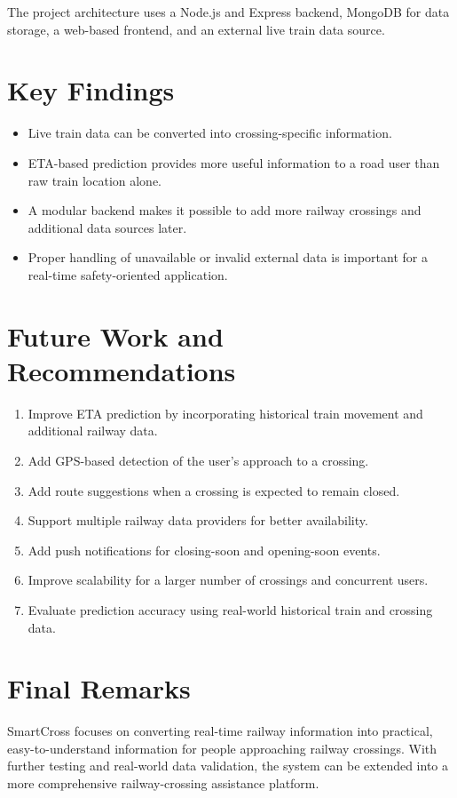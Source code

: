 \documentclass[12pt,a4paper]{report}
\begin{document}
The project architecture uses a Node.js and Express backend, MongoDB for data
storage, a web-based frontend, and an external live train data source.

\section{Key Findings}

\begin{itemize}
  \item Live train data can be converted into crossing-specific information.
  \item ETA-based prediction provides more useful information to a road user than
        raw train location alone.
  \item A modular backend makes it possible to add more railway crossings and
        additional data sources later.
  \item Proper handling of unavailable or invalid external data is important for
        a real-time safety-oriented application.
\end{itemize}

\section{Future Work and Recommendations}

\begin{enumerate}
  \item Improve ETA prediction by incorporating historical train movement and
        additional railway data.
  \item Add GPS-based detection of the user's approach to a crossing.
  \item Add route suggestions when a crossing is expected to remain closed.
  \item Support multiple railway data providers for better availability.
  \item Add push notifications for closing-soon and opening-soon events.
  \item Improve scalability for a larger number of crossings and concurrent users.
  \item Evaluate prediction accuracy using real-world historical train and
        crossing data.
\end{enumerate}

\section{Final Remarks}

SmartCross focuses on converting real-time railway information into practical,
easy-to-understand information for people approaching railway crossings. With
further testing and real-world data validation, the system can be extended into a
more comprehensive railway-crossing assistance platform.

\end{document}
